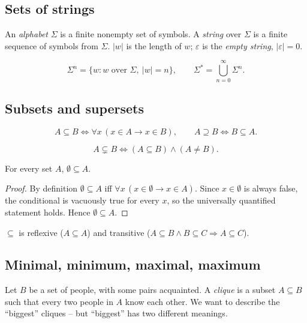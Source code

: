 \documentclass[11pt]{article}
\begin{document}
\subsection{Sets of strings}
\label{sec:1-5}
\begin{definition}
An \emph{alphabet} $\Sigma$ is a finite nonempty set of symbols. A \emph{string} over $\Sigma$ is a finite sequence of symbols from $\Sigma$. $|w|$ is the length of $w$; $\varepsilon$ is the \emph{empty string}, $|\varepsilon| = 0$.
\end{definition}

\begin{definition}
\[
\Sigma^n = \{w : w \text{ over } \Sigma,\ |w| = n\}, \qquad
\Sigma^* = \bigcup_{n=0}^{\infty} \Sigma^n.
\]
\end{definition}

\subsection{Subsets and supersets}
\label{sec:1-6}
\begin{definition}
\[
A \subseteq B \iff \forall x\,(x \in A \rightarrow x \in B), \qquad
A \supseteq B \iff B \subseteq A.
\]
\end{definition}

\begin{definition}
\[
A \subsetneq B \iff (A \subseteq B) \wedge (A \neq B).
\]
\end{definition}

\begin{theorem}
For every set $A$, $\emptyset \subseteq A$.
\end{theorem}
\begin{proof}
By definition $\emptyset \subseteq A$ iff $\forall x\,(x \in \emptyset \rightarrow x \in A)$. Since $x \in \emptyset$ is always false, the conditional is vacuously true for every $x$, so the universally quantified statement holds. Hence $\emptyset \subseteq A$.
\end{proof}

\begin{theorem}
$\subseteq$ is reflexive ($A \subseteq A$) and transitive ($A \subseteq B \wedge B \subseteq C \Rightarrow A \subseteq C$).
\end{theorem}

\subsection{Minimal, minimum, maximal, maximum}
\label{sec:1-7}
\begin{example}
Let $B$ be a set of people, with some pairs acquainted. A \emph{clique} is a subset $A \subseteq B$ such that every two people in $A$ know each other. We want to describe the ``biggest'' cliques -- but ``biggest'' has two different meanings.
\end{example}
\end{document}
